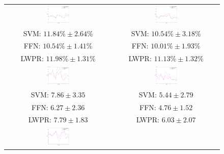 \begin{figure}[!ht] \centering
  \begin{tabular}{cc}
    \includegraphics[width=0.22\textwidth]{figs/fig_err_regr_resCrossBestOnDay1} &
    \includegraphics[width=0.22\textwidth]{figs/fig_err_regr_resCrossBestOnDay2} \\
     SVM: $11.84\% \pm 2.64\%$ &  SVM: $10.54\% \pm 3.18\%$ \\
     FFN: $10.54\% \pm 1.41\%$ &  FFN: $10.01\% \pm 1.93\%$ \\
    LWPR: $11.98\% \pm 1.31\%$ & LWPR: $11.13\% \pm 1.32\%$ \\
    \includegraphics[width=0.22\textwidth]{figs/fig_MSE_regr_resCrossBestOnDay1} &
    \includegraphics[width=0.22\textwidth]{figs/fig_MSE_regr_resCrossBestOnDay2} \\
     SVM: $7.86 \pm 3.35$ &  SVM: $5.44 \pm 2.79$ \\
     FFN: $6.27 \pm 2.36$ &  FFN: $4.76 \pm 1.52$ \\
    LWPR: $7.79 \pm 1.83$ & LWPR: $6.03 \pm 2.07$ \\
    \includegraphics[width=0.22\textwidth]{figs/fig_SCC_regr_resCrossBestOnDay1} &

\end{tabular}
\end{figure}
